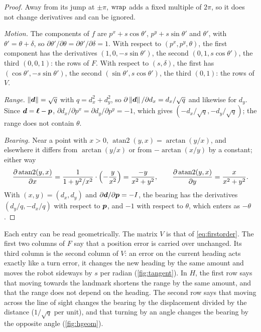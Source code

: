 \begin{proof}
Away from its jump at $\pm\pi$, $\operatorname{wrap}$ adds a fixed multiple of
$2\pi$, so it does not change derivatives and can be ignored.

\emph{Motion.} The components of $f$ are $p^x+s\cos\theta'$,
$p^y+s\sin\theta'$ and $\theta'$, with $\theta'=\theta+\delta$, so
$\partial\theta'/\partial\theta=\partial\theta'/\partial\delta=1$. With
respect to $(p^x,p^y,\theta)$, the first component has the derivatives
$(1,0,-s\sin\theta')$, the second $(0,1,s\cos\theta')$, the third
$(0,0,1)$: the rows of $F$. With respect to $(s,\delta)$, the first has
$(\cos\theta',-s\sin\theta')$, the second $(\sin\theta',s\cos\theta')$,
the third $(0,1)$: the rows of $V$.

\emph{Range.} $\left\lVert \bm{d}\right\rVert=\sqrt q$ with $q=d_x^2+d_y^2$, so
$\partial\left\lVert \bm{d}\right\rVert/\partial d_x=d_x/\sqrt q$ and likewise for $d_y$.
Since $\bm{d}=\bm{\ell}-\bm{p}$, $\partial d_x/\partial p^x=\partial
d_y/\partial p^y=-1$, which gives $(-d_x/\sqrt q,-d_y/\sqrt q)$; the range
does not contain $\theta$.

\emph{Bearing.} Near a point with $x>0$,
$\operatorname{atan2}(y,x)=\arctan(y/x)$, and elsewhere it differs from
$\arctan(y/x)$ or from $-\arctan(x/y)$ by a constant; either way
\[
  \frac{\partial\operatorname{atan2}(y,x)}{\partial x}
  =\frac{1}{1+y^2/x^2}\cdot\Bigl(-\frac y{x^2}\Bigr)=\frac{-y}{x^2+y^2},
  \qquad
  \frac{\partial\operatorname{atan2}(y,x)}{\partial y}=\frac{x}{x^2+y^2}.
\]
With $(x,y)=(d_x,d_y)$ and $\partial\bm{d}/\partial\bm{p}=-I$, the bearing
has the derivatives $(d_y/q,-d_x/q)$ with respect to $\bm{p}$, and $-1$ with
respect to $\theta$, which enters as $-\theta$.
\end{proof}

Each entry can be read geometrically. The matrix $V$ is that of
\eqref{eq:firstorder}. The first two columns of $F$ say that a position
error is carried over unchanged. Its third column is the second column of
$V$: an error on the current heading acts exactly like a turn error, it
changes the new heading by the same amount and moves the robot sideways by
$s$ per radian (\cref{fig:tangent}). In $H$, the first row says that moving
towards the landmark shortens the range by the same amount, and that the
range does not depend on the heading. The second row says that moving
across the line of sight changes the bearing by the displacement divided
by the distance ($1/\sqrt q$ per unit), and that turning by an angle
changes the bearing by the opposite angle (\cref{fig:hgeom}).

